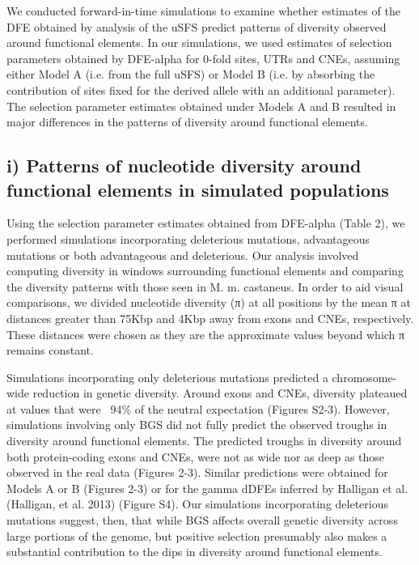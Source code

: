         	We conducted forward-in-time simulations to examine whether estimates of the DFE obtained by analysis of the uSFS predict patterns of diversity observed around functional elements. In our simulations, we used estimates of selection parameters obtained by DFE-alpha for 0-fold sites, UTRs and CNEs, assuming either Model A (i.e. from the full uSFS) or Model B (i.e. by absorbing the contribution of sites fixed for the derived allele with an additional parameter). The selection parameter estimates obtained under Models A and B resulted in major differences in the patterns of diversity around functional elements.

	\subsection{i) Patterns of nucleotide diversity around functional elements in simulated populations}

	Using the selection parameter estimates obtained from DFE-alpha (Table 2), we performed simulations incorporating deleterious mutations, advantageous mutations or both advantageous and deleterious. Our analysis involved computing diversity in windows surrounding functional elements and comparing the diversity patterns with those seen in M. m. castaneus. In order to aid visual comparisons, we divided nucleotide diversity (π) at all positions by the mean π at distances greater than 75Kbp and 4Kbp away from exons and CNEs, respectively. These distances were chosen as they are the approximate values beyond which π remains constant.

Simulations incorporating only deleterious mutations predicted a chromosome-wide reduction in genetic diversity. Around exons and CNEs, diversity plateaued at values that were ~94\% of the neutral expectation (Figures S2-3). However, simulations involving only BGS did not fully predict the observed troughs in diversity around functional elements. The predicted troughs in diversity around both protein-coding exons and CNEs, were not as wide nor as deep as those observed in the real data (Figures 2-3). Similar predictions were obtained for Models A or B (Figures 2-3) or for the gamma dDFEs inferred by Halligan et al. (Halligan, et al. 2013) (Figure S4). Our simulations incorporating deleterious mutations suggest, then, that while BGS affects overall genetic diversity across large portions of the genome, but positive selection presumably also makes a substantial contribution to the dips in diversity around functional elements.

